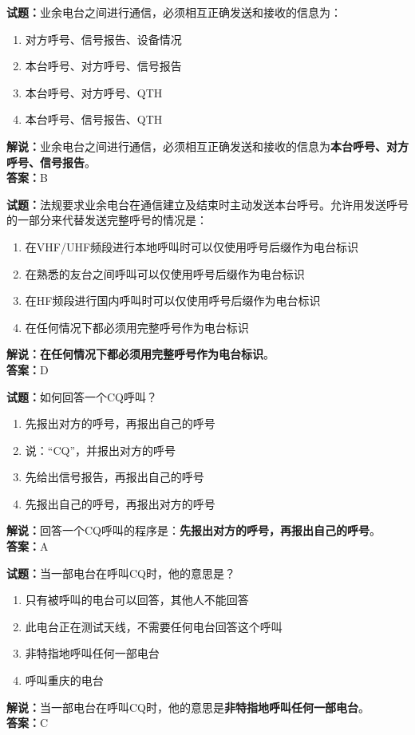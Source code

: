 \documentclass{ctexbook}
\begin{document}
\bigskip


\noindent\textbf{试题：}业余电台之间进行通信，必须相互正确发送和接收的信息为：
\begin{enumerate}[leftmargin=3em]
\item 对方呼号、信号报告、设备情况
\item 本台呼号、对方呼号、信号报告
\item 本台呼号、对方呼号、QTH
\item 本台呼号、信号报告、QTH
\end{enumerate}
\noindent\textbf{解说：}业余电台之间进行通信，必须相互正确发送和接收的信息为\textbf{本台呼号、对方呼号、信号报告}。\\\noindent\textbf{答案：}B




\bigskip


\noindent\textbf{试题：}法规要求业余电台在通信建立及结束时主动发送本台呼号。允许用发送呼号的一部分来代替发送完整呼号的情况是：
\begin{enumerate}[leftmargin=3em]
\item 在VHF/UHF频段进行本地呼叫时可以仅使用呼号后缀作为电台标识
\item 在熟悉的友台之间呼叫可以仅使用呼号后缀作为电台标识
\item 在HF频段进行国内呼叫时可以仅使用呼号后缀作为电台标识
\item 在任何情况下都必须用完整呼号作为电台标识
\end{enumerate}
\noindent\textbf{解说：}\textbf{在任何情况下都必须用完整呼号作为电台标识}。\\\noindent\textbf{答案：}D



\bigskip


\noindent\textbf{试题：}如何回答一个CQ呼叫？
\begin{enumerate}[leftmargin=3em]
\item 先报出对方的呼号，再报出自己的呼号
\item 说：“CQ”，并报出对方的呼号
\item 先给出信号报告，再报出自己的呼号
\item 先报出自己的呼号，再报出对方的呼号
\end{enumerate}
\noindent\textbf{解说：}回答一个CQ呼叫的程序是：\textbf{先报出对方的呼号，再报出自己的呼号}。\\\noindent\textbf{答案：}A



\bigskip


\noindent\textbf{试题：}当一部电台在呼叫CQ时，他的意思是？
\begin{enumerate}[leftmargin=3em]
\item 只有被呼叫的电台可以回答，其他人不能回答
\item 此电台正在测试天线，不需要任何电台回答这个呼叫
\item 非特指地呼叫任何一部电台
\item 呼叫重庆的电台
\end{enumerate}
\noindent\textbf{解说：}当一部电台在呼叫CQ时，他的意思是\textbf{非特指地呼叫任何一部电台}。\\\noindent\textbf{答案：}C
\end{document}
